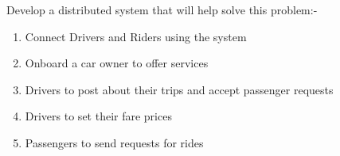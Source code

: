 Develop a distributed system that will help solve this problem:-

\begin{enumerate}
    \item Connect Drivers and Riders using the system
    \item Onboard a car owner to offer services
    \item Drivers to post about their trips and accept passenger requests
    \item Drivers to set their fare prices
    \item Passengers to send requests for rides
\end{enumerate}
